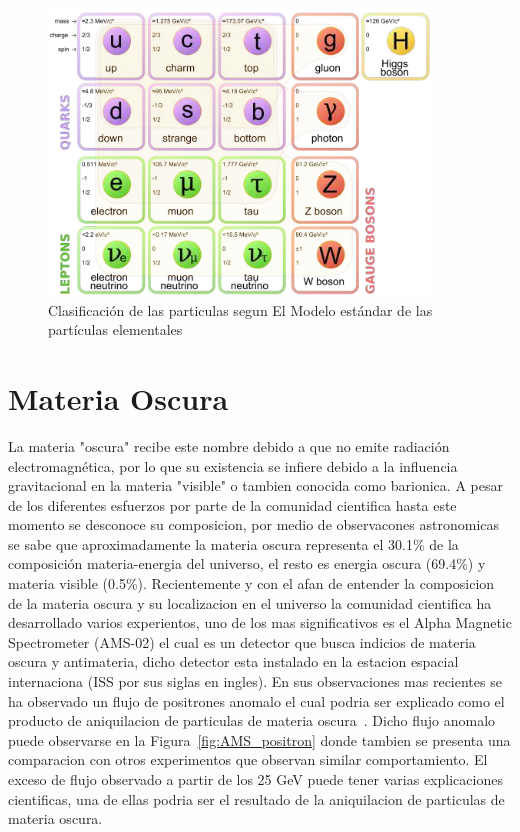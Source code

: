 \begin{figure}
\begin{center}
  \includegraphics[width=4.0in]{standard-model.png}
  \caption{Clasificaci\'on de las particulas segun El Modelo est\'andar de las part\'iculas elementales}
  \label{fig:ME}
\end{center}
\end{figure}


\section{Materia Oscura}

La materia "oscura" recibe este nombre debido a que no emite radiaci\'on electromagn\'etica, por lo que su existencia se infiere debido a la influencia gravitacional en la materia "visible" o tambien conocida como barionica. A pesar de los diferentes esfuerzos por parte de la comunidad cientifica hasta este momento se desconoce su composicion, por medio de observacones astronomicas se sabe que aproximadamente la materia oscura representa el 30.1\%  de la composici\'on materia-energia del universo, el resto es energia oscura (69.4\%) y materia visible (0.5\%). Recientemente y con el afan de entender la composicion de la materia oscura y su localizacion en el universo la comunidad cientifica ha desarrollado varios experientos, uno de los mas significativos es el Alpha Magnetic Spectrometer (AMS-02) el cual es un detector que busca indicios de materia oscura y antimateria, dicho detector esta instalado en la estacion espacial internaciona (ISS por sus siglas en ingles). En sus observaciones mas recientes se ha observado un flujo de positrones anomalo el cual podria ser explicado como el producto de aniquilacion de particulas de materia oscura~\cite{ams:cern}.  Dicho flujo anomalo puede observarse en la Figura~\ref{fig:AMS_positron} donde tambien se presenta una comparacion con otros experimentos que observan similar comportamiento.  El exceso de flujo observado a partir de los 25 GeV puede tener varias explicaciones cientificas, una de ellas podria ser el resultado de la aniquilacion de particulas de materia oscura. 


